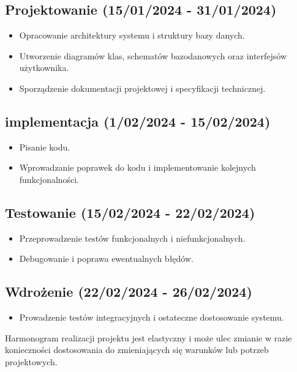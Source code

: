 \subsection{Projektowanie (15/01/2024 - 31/01/2024)}
\begin{itemize}
    \item Opracowanie architektury systemu i struktury bazy danych.
    \item Utworzenie diagramów klas, schematów bazodanowych oraz interfejsów użytkownika.
    \item Sporządzenie dokumentacji projektowej i specyfikacji technicznej.
\end{itemize}

\subsection{implementacja (1/02/2024 - 15/02/2024)}
\begin{itemize}
    \item Pisanie kodu.
    \item Wprowadzanie poprawek do kodu i implementowanie kolejnych funkcjonalności.
\end{itemize}

\subsection{Testowanie (15/02/2024 - 22/02/2024)}
\begin{itemize}
    \item Przeprowadzenie testów funkcjonalnych i niefunkcjonalnych.
    \item Debugowanie i poprawa ewentualnych błędów.
\end{itemize}

\subsection{Wdrożenie (22/02/2024 - 26/02/2024)}
\begin{itemize}
    \item Prowadzenie testów integracyjnych i ostateczne dostosowanie systemu.
\end{itemize}

Harmonogram realizacji projektu jest elastyczny i może ulec zmianie w razie konieczności dostosowania do zmieniających się warunków lub potrzeb projektowych.


